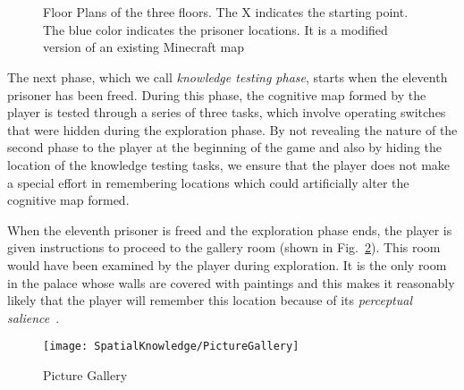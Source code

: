 \begin{figure}[!tb]
  \centering
   \\
  \\
  \caption[Floor Plans of the three floors]{Floor Plans of the three floors. The X indicates the starting point. The blue color indicates the prisoner locations. It is a modified version of an existing Minecraft map~\cite{RoyalPalaceMap}}
  \label{fig:FloorPlans}
\end{figure}



The next phase, which we call \emph{knowledge testing phase}, starts when the eleventh prisoner has been freed. During this phase, the cognitive map formed by the player is tested through a series of three tasks, which involve operating switches that were hidden during the exploration phase. By not revealing the nature of the second phase to the player at the beginning of the game and also by hiding the location of the knowledge testing tasks, we ensure that the player does not make a special effort in remembering locations which could artificially alter the cognitive map formed.

When the eleventh prisoner is freed and the exploration phase ends, the player is given instructions to proceed to the gallery room (shown in Fig.~\ref{fig:MinecraftEscapePaintingRoom}). This room would have been examined by the player during exploration. It is the only room in the palace whose walls are covered with paintings and this makes it reasonably likely that the player will remember this location because of its \emph{perceptual salience}~\cite{Davis01122009}.


\begin{figure}[!tb]
    \begin{center}
        \texttt{[image: SpatialKnowledge/PictureGallery]}
    \end{center}
    \caption{Picture Gallery}
    \label{fig:MinecraftEscapePaintingRoom}
\end{figure}


